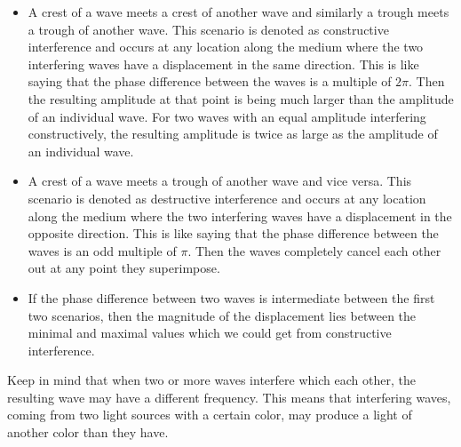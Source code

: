 \begin{itemize}
  \item A crest of a wave meets a crest of another wave and similarly a trough meets a trough of another wave. This scenario is denoted as constructive interference and occurs at any location along the medium where the two interfering waves have a displacement in the same direction. This is like saying that the phase difference between the waves is a multiple of $2\pi$. Then the resulting amplitude at that point is being much larger than the amplitude of an individual wave. For two waves with an equal amplitude interfering constructively, the resulting amplitude is twice as large as the amplitude of an individual wave.
  \item A crest of a wave meets a trough of another wave and vice versa. This scenario is denoted as destructive interference and occurs at any location along the medium where the two interfering waves have a displacement in the opposite direction. This is like saying that the phase difference between the waves is an odd multiple of $\pi$. Then the waves completely cancel each other out at any point they superimpose.
  \item If the phase difference between two waves is intermediate between the first two scenarios, then the magnitude of the displacement lies between the minimal and maximal values which we could get from constructive interference.
\end{itemize}

Keep in mind that when two or more waves interfere which each other, the resulting wave may have a different frequency. This means that interfering waves, coming from two light sources with a certain color, may produce a light of another color than they have.

